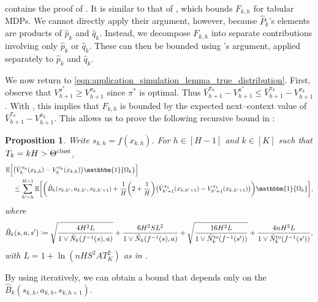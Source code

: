 \documentclass[11pt]{article}
\newcommand{\eqdef}{\vcentcolon=}
\newcommand{\mbbE}{\mathbb{E}}
\newcommand{\clust}{\textnormal{clust}}
\newtheorem{proposition}[theorem]{Proposition}
\theoremstyle{definition}
\theoremstyle{definition}
\begin{document}
 contains the proof of .
It is similar to that of \cite[Lemma 3]{UCRLVI}, which bounds $F_{k,h}$ for tabular \glspl{MDP}.
We cannot directly apply their argument, however, because $\hat{P}_k$'s elements are products of $\hat{p}_k$ and $\hat{q}_k$.
Instead, we decompose $F_{k,h}$ into separate contributions involving only $\hat{p}_k$ or $\hat{q}_k$.
These can then be bounded using \cite{UCRLVI}'s argument, applied separately to $\hat{p}_k$ and $\hat{q}_k$.

We now return to \eqref{eqn:application_simulation_lemma_true_distribution}.
First, observe that $V^{\pi^*}_{h+1}\geq V^{\pi_k}_{h+1}$ since $\pi^*$ is optimal.
Thus $\bar{V}^{\pi_k}_{h+1} - V^{\pi^*}_{h+1}\leq \bar{V}^{\pi_k}_{h+1} - V^{\pi_k}_{h+1}$.
With , this implies that $F_{k,h}$ is bounded by the expected next--context value of $\bar{V}^{\pi_k}_{h+1} - V^{\pi_k}_{h+1}$.
This allows us to prove the following recursive bound in :
\begin{proposition}
	\label{prop:estimation_error_bound}
	Write $s_{k,h}=f(x_{k,h})$.
	For $h\in[H-1]$ and $k\in[K]$ such that $T_k=kH>\Theta^{\clust}$,
	\begin{align}
		\mbbE\Bigl[ & \bigl(\bar{V}_h^{\pi_k}(x_{k,h})-V_h^{\pi_k}(x_{k,h}) \bigr) \mathbbm{1}\{\Omega_k\} \Bigr]
		\label{eqn:estimation_error_bound}
		\\
		       &
		\leq
		\sum_{h'=h}^{H-1}\mbbE\biggl[
		\biggl(
			\hat{B}_{k}(s_{k,h'},a_{k,h'},s_{k,h'+1})
			+
			\frac{1}{H}\biggl(2+\frac{1}{H}\biggr)
			\bigl(\bar{V}_{h'+1}^{\pi_k}(x_{k,h'+1})-V_{h'+1}^{\pi_k}(x_{k,h'+1})\bigr)
		\biggr)
		\mathbbm{1}\{\Omega_k\}
		\biggr]
		,
		\nonumber
	\end{align}
	where
	\begin{equation}
		\label{eqn:bounding_term_definition}
		\hat{B}_{k}(s,a,s')
		\eqdef
		\sqrt{\frac{4H^2 L}{1\vee \hat{N}_k(f^{-1}(s),a)}}
		+
		\frac{6H^2SL^2}{1\vee \hat{N}_k(f^{-1}(s),a)}
		+
		\sqrt{\frac{16H^2 L}{1\vee \hat{N}^{\mathrm{to}}_k(f^{-1}(s'))}}
		+
		\frac{4nH^2L}{1\vee \hat{N}^{\mathrm{to}}_k(f^{-1}(s'))}
		,
	\end{equation}
	with $L=1+\ln(nHS^2AT_K^2)$ as in .
\end{proposition}
By using  iteratively, we can obtain a bound that depends only on the $\hat{B}_{k}( s_{k,h}, \allowbreak a_{k,h}, \allowbreak s_{k,h+1})$.
\end{document}
